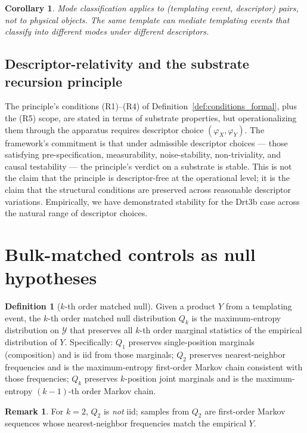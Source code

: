 \documentclass[11pt]{article}
\theoremstyle{plain}
\newtheorem{corollary}[theorem]{Corollary}
\theoremstyle{definition}
\newtheorem{definition}[theorem]{Definition}
\newtheorem{remark}[theorem]{Remark}
\newcommand{\descX}{\varphi_X}
\newcommand{\descY}{\varphi_Y}
\begin{document}
\begin{corollary}
Mode classification applies to (templating event, descriptor) pairs, not to physical objects. The same template can mediate templating events that classify into different modes under different descriptors.
\end{corollary}

\subsection{Descriptor-relativity and the substrate recursion principle}

The principle's conditions (R1)--(R4) of Definition~\ref{def:conditions_formal}, plus the (R5) scope, are stated in terms of substrate properties, but operationalizing them through the apparatus requires descriptor choice $(\descX, \descY)$. The framework's commitment is that under admissible descriptor choices --- those satisfying pre-specification, measurability, noise-stability, non-triviality, and causal testability --- the principle's verdict on a substrate is stable. This is not the claim that the principle is descriptor-free at the operational level; it is the claim that the structural conditions are preserved across reasonable descriptor variations. Empirically, we have demonstrated stability for the Drt3b case across the natural range of descriptor choices.


\section{Bulk-matched controls as null hypotheses}

\begin{definition}[$k$-th order matched null]
Given a product $Y$ from a templating event, the $k$-th order matched null distribution $Q_k$ is the maximum-entropy distribution on $\mathcal{Y}$ that preserves all $k$-th order marginal statistics of the empirical distribution of $Y$. Specifically: $Q_1$ preserves single-position marginals (composition) and is iid from those marginals; $Q_2$ preserves nearest-neighbor frequencies and is the maximum-entropy first-order Markov chain consistent with those frequencies; $Q_k$ preserves $k$-position joint marginals and is the maximum-entropy $(k-1)$-th order Markov chain.
\end{definition}

\begin{remark}
For $k = 2$, $Q_2$ is \emph{not} iid; samples from $Q_2$ are first-order Markov sequences whose nearest-neighbor frequencies match the empirical $Y$.
\end{remark}
\end{document}
